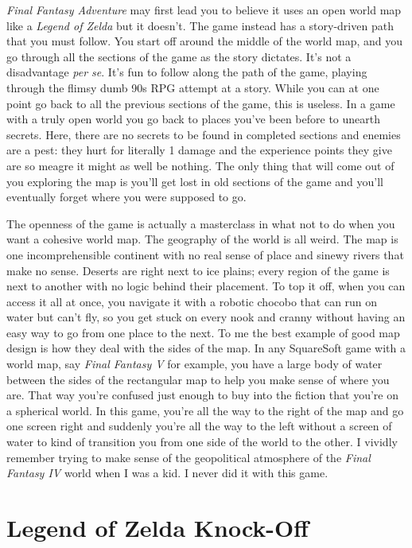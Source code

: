 \documentclass{book}
\begin{document}
\emph{Final Fantasy Adventure} may first lead you to believe it uses an open world map like a \emph{Legend of Zelda} but it doesn’t. The game instead has a story-driven path that you must follow. You start off around the middle of the world map, and you go through all the sections of the game as the story dictates. It’s not a disadvantage \emph{per se}. It’s fun to follow along the path of the game, playing through the flimsy dumb 90s RPG attempt at a story. While you can at one point go back to all the previous sections of the game, this is useless. In a game with a truly open world you go back to places you’ve been before to unearth secrets. Here, there are no secrets to be found in completed sections and enemies are a pest: they hurt for literally 1 damage and the experience points they give are so meagre it might as well be nothing. The only thing that will come out of you exploring the map is you’ll get lost in old sections of the game and you’ll eventually forget where you were supposed to go.

The openness of the game is actually a masterclass in what not to do when you want a cohesive world map. The geography of the world is all weird. The map is one incomprehensible continent with no real sense of place and sinewy rivers that make no sense. Deserts are right next to ice plains; every region of the game is next to another with no logic behind their placement. To top it off, when you can access it all at once, you navigate it with a robotic chocobo that can run on water but can’t fly, so you get stuck on every nook and cranny without having an easy way to go from one place to the next. To me the best example of good map design is how they deal with the sides of the map. In any SquareSoft game with a world map, say \emph{Final Fantasy V} for example, you have a large body of water between the sides of the rectangular map to help you make sense of where you are. That way you’re confused just enough to buy into the fiction that you’re on a spherical world. In this game, you’re all the way to the right of the map and go one screen right and suddenly you’re all the way to the left without a screen of water to kind of transition you from one side of the world to the other. I vividly remember trying to make sense of the geopolitical atmosphere of the \emph{Final Fantasy IV} world when I was a kid. I never did it with this game.

\FloatBarrier\needspace{10mm}\section*{Legend of Zelda Knock-Off}\nopagebreak[4]
\end{document}
